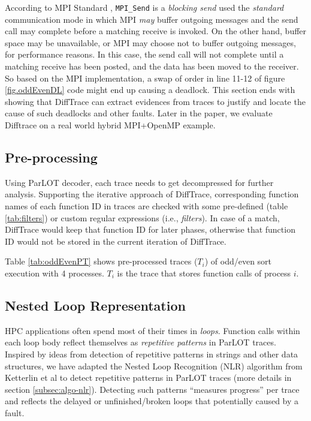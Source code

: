 According to MPI Standard , \texttt{MPI\_Send} is a \textit{blocking send} used the \textit{standard} communication mode in which MPI \textit{may} buffer outgoing messages and the send call may complete before a matching receive is invoked. On the other hand, buffer space may be unavailable, or MPI may choose not to buffer outgoing messages, for performance reasons. In this case, the send call will not complete until a matching receive has been posted, and the data has been moved to the receiver. So based on the MPI implementation, a swap of order in line 11-12 of figure \ref{fig.oddEvenDL} code might end up causing a deadlock. This section ends with showing that DiffTrace can extract evidences from traces to justify and locate the cause of such deadlocks and other faults. Later in the paper, we evaluate Difftrace on a real world hybrid MPI+OpenMP example.

\subsection{Pre-processing}

Using ParLOT decoder, each trace needs to get decompressed for further analysis.
Supporting the iterative approach of DiffTrace, corresponding function names of each function ID in traces are checked with some pre-defined (table \ref{tab:filters}) or custom regular expressions (i.e., \textit{filters}). In case of a match, DiffTrace would keep that function ID for later phases, otherwise that function ID would not be stored in the current iteration of DiffTrace.

Table \ref{tab:oddEvenPT} shows pre-processed traces ($T_i$) of odd/even sort execution with 4 processes. $T_i$ is the trace that stores function calls of process $i$.



\subsection{Nested Loop Representation}



HPC applications often spend most of their times in \textit{loops}. Function calls within each loop body reflect themselves as \textit{repetitive patterns} in ParLOT traces. Inspired by ideas from detection of repetitive patterns in strings \cite{nakamura_fast_2013} and other data structures\cite{kmr}, we have adapted the Nested Loop Recognition (NLR) algorithm from Ketterlin et al \cite{Ketterlin-nlr} to detect repetitive patterns in ParLOT traces (more details in section \ref{subsec:algo-nlr}). Detecting such patterns ``measures progress'' per trace and reflects the delayed or unfinished/broken loops that potentially caused by a fault.

